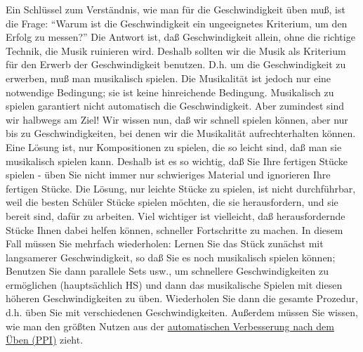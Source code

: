 Ein Schlüssel zum Verständnis, wie man für die Geschwindigkeit üben muß, ist die Frage: \enquote{Warum ist die Geschwindigkeit ein ungeeignetes Kriterium, um den Erfolg zu messen?}
Die Antwort ist, daß Geschwindigkeit allein, ohne die richtige Technik, die Musik ruinieren wird.
Deshalb sollten wir die Musik als Kriterium für den Erwerb der Geschwindigkeit benutzen.
D.h. um die Geschwindigkeit zu erwerben, muß man musikalisch spielen.
Die Musikalität ist jedoch nur eine notwendige Bedingung; sie ist keine hinreichende Bedingung.
Musikalisch zu spielen garantiert nicht automatisch die Geschwindigkeit.
Aber zumindest sind wir halbwegs am Ziel!
Wir wissen nun, daß wir schnell spielen können, aber nur bis zu Geschwindigkeiten, bei denen wir die Musikalität aufrechterhalten können.
Eine Lösung ist, nur Kompositionen zu spielen, die so leicht sind, daß man sie musikalisch spielen kann.
Deshalb ist es so wichtig, daß Sie Ihre fertigen Stücke spielen - üben Sie nicht immer nur schwieriges Material und ignorieren Ihre fertigen Stücke.
Die Lösung, nur leichte Stücke zu spielen, ist nicht durchführbar, weil die besten Schüler Stücke spielen möchten, die sie herausfordern, und sie bereit sind, dafür zu arbeiten. 
Viel wichtiger ist vielleicht, daß herausfordernde Stücke Ihnen dabei helfen können, schneller Fortschritte zu machen.
In diesem Fall müssen Sie mehrfach wiederholen: Lernen Sie das Stück zunächst mit langsamerer Geschwindigkeit, so daß Sie es noch musikalisch spielen können; Benutzen Sie dann parallele Sets usw., um schnellere Geschwindigkeiten zu ermöglichen (hauptsächlich HS) und dann das musikalische Spielen mit diesen höheren Geschwindigkeiten zu üben.
Wiederholen Sie dann die gesamte Prozedur, d.h. üben Sie mit verschiedenen Geschwindigkeiten.
Außerdem müssen Sie wissen, wie man den größten Nutzen aus der \hyperlink{c1ii15}{automatischen Verbesserung nach dem Üben (PPI)} zieht.

